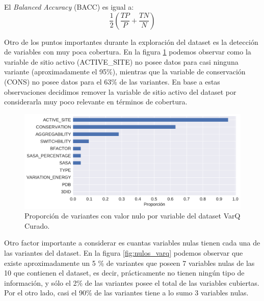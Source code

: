 \newpage

El \textit{Balanced Accuracy} (BACC) es igual a:
\begin{equation*}
    \frac{1}{2} (\frac{TP}{P} + \frac{TN}{N})
\end{equation*}

Otro de los puntos importantes durante la exploración del dataset es la detección de variables con muy poca cobertura. En la figura \ref{fig:proporcion_nulos_varq} podemos observar como la variable de sitio activo (ACTIVE\_SITE) no posee datos para casi ninguna variante (aproximadamente el 95\%), mientras que la variable de conservación (CONS) no posee datos para el 63\% de las variantes. En base a estas observaciones decidimos remover la variable de sitio activo del dataset por considerarla muy poco relevante en términos de cobertura.

\begin{figure}[H]
    \centering
    \includegraphics[scale=0.55]{documents/latex/figures/3/varq/proporcion_nulos.pdf}
    \caption{Proporción de variantes con valor nulo por variable del dataset VarQ Curado.}
    \label{fig:proporcion_nulos_varq}
\end{figure}

Otro factor importante a considerar es cuantas variables nulas tienen cada una de las variantes del dataset. En la figura \ref{fig:nulos_varq} podemos observar que existe aproximadamente un 5 \% de variantes que poseen 7 variables nulas de las 10 que contienen el dataset, es decir, prácticamente no tienen ningún tipo de información, y sólo el 2\% de las variantes posee el total de las variables cubiertas. Por el otro lado, casi el 90\% de las variantes tiene a lo sumo 3 variables nulas.


